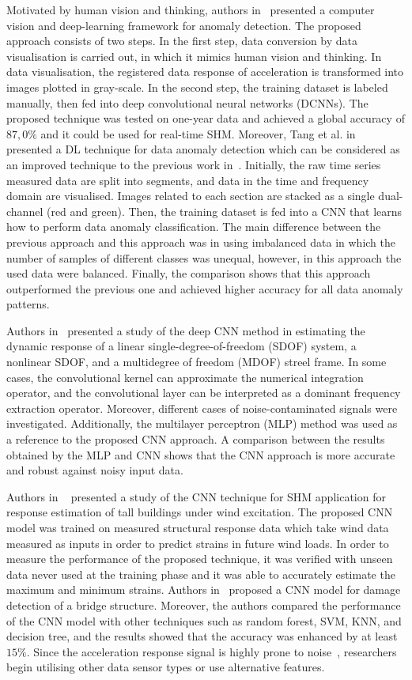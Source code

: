 Motivated by human vision and thinking, authors in~\cite{Cha2018} presented a computer vision and deep-learning framework for anomaly detection.
The proposed approach consists of two steps.
In the first step, data conversion by data visualisation is carried out, in which it mimics human vision and thinking.
In data visualisation,  the registered data response of acceleration is transformed into images plotted in gray-scale. 
In the second step, the training dataset is labeled manually, then fed into deep convolutional neural networks (DCNNs).
The proposed technique was tested on one-year data and achieved a global accuracy of \(87,0\%\) and it could be used for real-time SHM.
Moreover, Tang et al. in~\cite{Tang2019} presented a DL technique for data anomaly detection which can be considered as an improved technique to the previous work in~\cite{Cha2018}.
Initially, the raw time series measured data are split into segments, and data in the time and frequency domain are visualised. 
Images related to each section are stacked as a single dual-channel (red and green).
Then, the training dataset is fed into a CNN that learns how to perform data anomaly classification.
The main difference between the previous approach and this approach was in using imbalanced data in which the number of samples of different classes was unequal, however, in this approach the used data were balanced.
Finally, the comparison shows that this approach outperformed the previous one and achieved higher accuracy for all data anomaly patterns.

Authors in~\cite{Wu2019} presented a study of the deep CNN method in estimating the dynamic response of a linear single-degree-of-freedom (SDOF) system, a nonlinear SDOF, and a multidegree of freedom (MDOF) streel frame.
In some cases, the convolutional kernel can approximate the numerical integration operator, and the convolutional layer can be interpreted as a dominant frequency extraction operator.
Moreover, different cases of noise-contaminated signals were investigated. 
Additionally, the multilayer perceptron (MLP) method was used as a reference to the proposed CNN approach.
A comparison between the results obtained by the MLP and CNN shows that the CNN approach is more accurate and robust against noisy input data.

Authors in ~\cite{Oh2019}  presented a study of the CNN technique for SHM application for response estimation of tall buildings under wind excitation.
The proposed CNN model was trained on measured structural response data which take wind data measured as inputs in order to predict strains in future wind loads.
In order to measure the performance of the proposed technique, it was verified with unseen data never used at the training phase and it was able to accurately estimate the maximum and minimum strains.
Authors in~\cite{Li2020} proposed a CNN model for damage detection of a bridge structure.
Moreover, the authors compared the performance of the CNN model with other techniques such as random forest, SVM, KNN, and decision tree, and the results showed that the accuracy was enhanced by at least \(15\%\).
Since the acceleration response signal is highly prone to noise~\cite{Azimi2020}, researchers begin utilising other data sensor types or use alternative features.  

